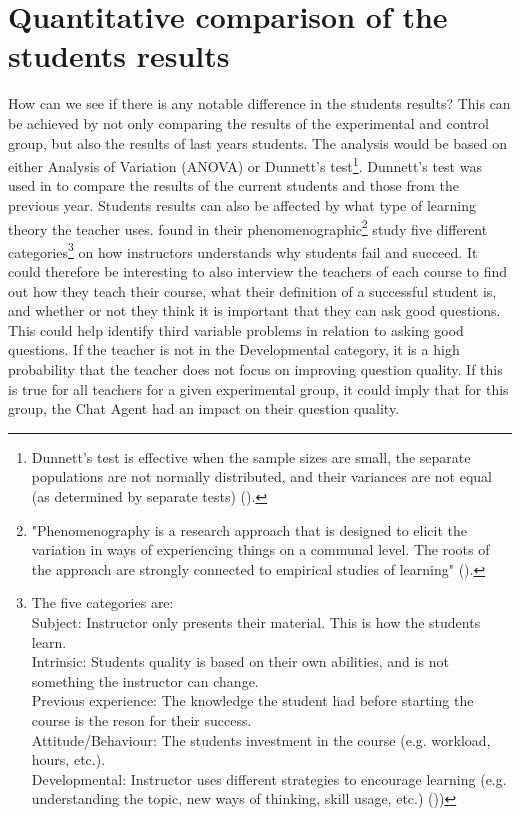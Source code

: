 \section{Quantitative comparison of the students results}
\label{chapter4:quantitative_comparison}
How can we see if there is any notable difference in the students results? This can be achieved by not only comparing the results of the experimental and control group, but 
also the results of last years students. The analysis would be based on either Analysis of Variation (ANOVA) or Dunnett's test\footnote{Dunnett's test is effective 
	when the sample sizes are small, the separate populations are not normally distributed, and their variances are not equal (as determined by separate tests) 
	(\citet[p.~3]{Simon2011}).}. Dunnett's test was used in \citet{Simon2011} to compare the results of the current students and those from the previous year.
\vspace{0.5em}\newline
Students results can also be affected by what type of learning theory the teacher uses. \citet{Kinnunen2007} found in their phenomenographic\footnote{"Phenomenography is a 
	research approach that is designed 	to elicit the variation in ways of experiencing things on a communal level. The roots of the approach are strongly
	connected to empirical studies of learning" (\citet[p.~3]{Kinnunen2007}).} study five different categories\footnote{The five categories are: \\
	Subject: Instructor only presents their material. This is how the students learn. \\
	Intrinsic: Students quality is based on their own abilities, and is not something the instructor can change. \\
	Previous experience: The knowledge the student had before starting the course is the reson for their success. \\
	Attitude/Behaviour: The students investment in the course (e.g. workload, hours, etc.).  \\
	Developmental: Instructor uses different strategies to encourage learning (e.g. understanding the topic, new ways of thinking, skill usage, etc.)
	(\citet[p.~5-7]{Kinnunen2007}))
	} on how instructors understands why students fail and succeed. 
It could therefore be interesting to also interview the teachers of each course to find out how they teach their course, what their definition of a successful student is, 
and whether or not they think it is important that they can ask good questions. This could help identify third variable problems in relation to asking good questions. If 
the teacher is not in the Developmental category, it is a high probability that the teacher does not focus on improving question quality. If this is true for all teachers 
for a given experimental group, it could imply that for this group, the Chat Agent had an impact on their question quality.
